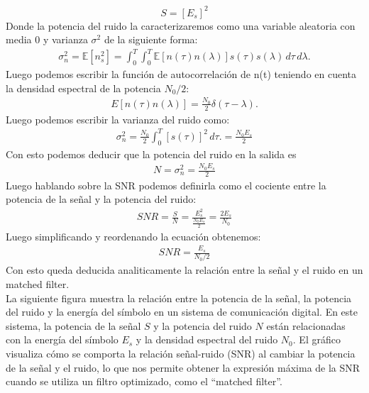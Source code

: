 \documentclass[
  11pt,
  letterpaper,
  answers
]{exam}
\begin{document}
\begin{questions}
\begin{solution}
  \begin{equation}
    S = [E_s]^2
  \end{equation}
  Donde la potencia del ruido la caracterizaremos como una variable aleatoria con media 0 y varianza $\sigma^2$ de la siguiente forma:
  \begin{align}
    \sigma_n^2 = \mathbb{E}[n_s^2] = \int_0^T \int_0^T \mathbb{E}[n(\tau) n(\lambda)] s(\tau) s(\lambda) \, d\tau \, d\lambda.
  \end{align}
  Luego podemos escribir la función de autocorrelación de n(t) teniendo en cuenta la densidad espectral de la potencia $N_0/2$:
  \begin{align}
    E[n(\tau)n(\lambda)] = \frac{N_0}{2} \delta(\tau-\lambda).
    \end{align}
  Luego podemos escribir la varianza del ruido como:
  \begin{align}
    \sigma_n^2 = \frac{N_0}{2} \int_0^T [s(\tau)]^2 \, d\tau. = \frac{N_0 E_s}{2}
  \end{align}
Con esto podemos deducir que la potencia del ruido en la salida es 
\begin{align}
  N = \sigma_n^2 = \frac{N_0 E_s}{2}
\end{align}
Luego hablando sobre la SNR podemos definirla como el cociente entre la potencia de la señal y la potencia del ruido:
\begin{align}
  SNR = \frac{S}{N} = \frac{E_s^2}{\frac{N_0 E_s}{2}} = \frac{2E_s}{N_0}
\end{align}
Luego simplificando  y reordenando la ecuación obtenemos:
\begin{align}
  SNR = \frac{E_s}{N_{0}/2}
\end{align}
Con esto queda deducida analiticamente la relación entre la señal y el ruido en un matched filter. \\

La siguiente figura muestra la relación entre la potencia de la señal, la potencia del ruido y la energía del símbolo en un sistema de comunicación digital. En este sistema, la potencia de la señal \( S \) y la potencia del ruido \( N \) están relacionadas con la energía del símbolo \( E_s \) y la densidad espectral del ruido \( N_0 \). El gráfico visualiza cómo se comporta la relación señal-ruido (SNR) al cambiar la potencia de la señal y el ruido, lo que nos permite obtener la expresión máxima de la SNR cuando se utiliza un filtro optimizado, como el “matched filter”.


\end{solution}
\end{questions}
\end{document}
